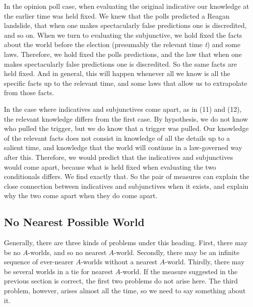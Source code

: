 In the opinion poll case, when evaluating the original indicative our knowledge at the earlier time was held fixed. We knew that the polls predicted a Reagan landslide, that when one makes spectacularly false predictions one is discredited, and so on. When we turn to evaluating the subjunctive, we hold fixed the facts about the world before the election (presumably the relevant time \textit{t}) and some laws. Therefore, we hold fixed the polls predictions, and the law that when one makes spectacularly false predictions one is discredited. So the same facts are held fixed. And in general, this will happen whenever all we know is all the specific facts up to the relevant time, and some laws that allow us to extrapolate from those facts.

In the case where indicatives and subjunctives come apart, as in (11) and (12), the relevant knowledge differs from the first case. By hypothesis, we do not know who pulled the trigger, but we do know that a trigger was pulled. Our knowledge of the relevant facts does not consist in knowledge of all the details up to a salient time, and knowledge that the world will continue in a law-governed way after this. Therefore, we would predict that the indicatives and subjunctives would come apart, because what is held fixed when evaluating the two conditionals differs. We find exactly that. So the pair of measures can explain the close connection between indicatives and subjunctives when it exists, and explain why the two come apart when they do come apart.

\subsection{No Nearest Possible World}
Generally, there are three kinds of problems under this heading. First, there may be no \(A\)-worlds, and so no nearest \(A\)-world. Secondly, there may be an infinite sequence of ever-nearer \(A\)-worlds without a nearest \(A\)-world. Thirdly, there may be several worlds in a tie for nearest \(A\)-world. If the measure suggested in the previous section is correct, the first two problems do not arise here. The third problem, however, arises almost all the time, so we need to say something about it.

